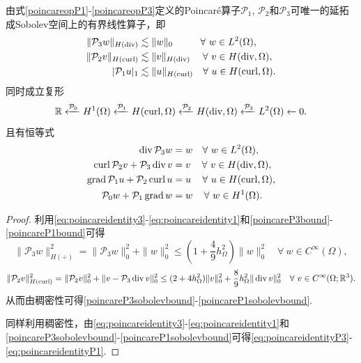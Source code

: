 \begin{theorem}
由式\eqref{poincareopP1}-\eqref{poincareopP3}定义的Poincar\'e算子$\mathcal{P}_1$, $\mathcal{P}_2$和$\mathcal{P}_3$可唯一的延拓成Sobolev空间上的有界线性算子，即
\begin{align}
\label{poincareP3sobolevbound}
\|\mathcal{P}_3w\|_{H(\operatorname{div})}&\lesssim \|w\|_0 \quad\quad\;\;\;\forall~w\in L^2(\Omega), \\
\label{poincareP2sobolevbound}
\|\mathcal{P}_2v\|_{H(\operatorname{curl})}&\lesssim \|v\|_{H(\operatorname{div})} \quad\;\forall~v\in H(\operatorname{div},\Omega), \\
\label{poincareP1sobolevbound}
|\mathcal{P}_1u|_{1}&\lesssim \|u\|_{H(\operatorname{curl})} \quad\forall~u\in H(\operatorname{curl},\Omega).
\end{align}
同时成立复形
\begin{equation}\label{eq:deRhamcomplexPoincare3d}
\mathbb R\xleftarrow{\mathcal{P}_0} H^1(\Omega)\xleftarrow{\mathcal{P}_1} H(\operatorname{curl}, \Omega)\xleftarrow{\mathcal{P}_2} H(\operatorname{div}, \Omega) \xleftarrow{\mathcal{P}_3} L^2(\Omega)\xleftarrow{}0.
\end{equation}
且有恒等式  
\begin{align}
\label{eq:poincareidentityP3}
\operatorname{div}\mathcal{P}_3w&=w \quad\forall~w\in L^{2}(\Omega), \\
\label{eq:poincareidentityP2}
\operatorname{curl}\mathcal{P}_2v+\mathcal{P}_3\operatorname{div} v&=v \quad\,\forall~v\in H(\operatorname{div}, \Omega), \\
\label{eq:poincareidentityP1}
\operatorname{grad}\mathcal{P}_1u+\mathcal{P}_2\operatorname{curl} u&=u \quad\,\forall~u\in H(\operatorname{curl},\Omega), \\
\label{eq:poincareidentityP0}
\mathcal{P}_0w+\mathcal{P}_1\operatorname{grad} w&=w \quad\,\forall~w\in H^1(\Omega).
\end{align}  
\end{theorem}
\begin{proof}
利用\eqref{eq:poincareidentity3}-\eqref{eq:poincareidentity1}和\eqref{poincareP3bound}-\eqref{poincareP1bound}可得
$$
\|\mathcal{P}_3w\|_{H(\div)}^2=\|\mathcal{P}_3w\|_{0}^2+\|w\|_0^2\leq(1+\frac{4}{9}h_{\Omega}^2)\|w\|_0^2 \quad \forall~w\in C^{\infty}(\Omega),
$$
$$
\|\mathcal{P}_2v\|_{H(\operatorname{curl})}^2=\|\mathcal{P}_2v\|_{0}^2+\|v-\mathcal{P}_3\operatorname{div} v\|_0^2\leq(2+4h_{\Omega}^2)\|v\|_0^2 +\frac{8}{9}h_{\Omega}^2\|\operatorname{div} v\|_0^2 \quad \forall~v\in C^{\infty}(\Omega;\mathbb R^3).
$$
从而由稠密性可得\eqref{poincareP3sobolevbound}-\eqref{poincareP1sobolevbound}.

同样利用稠密性，由\eqref{eq:poincareidentity3}-\eqref{eq:poincareidentity1}和\eqref{poincareP3sobolevbound}-\eqref{poincareP1sobolevbound}可得\eqref{eq:poincareidentityP3}-\eqref{eq:poincareidentityP1}.
\end{proof}

